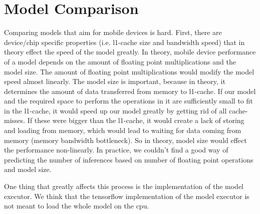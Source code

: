\iffalse
\section{Working with ImageNet}
Most of the research compares models based on ImageNet\cite{howard2017mobilenets} 
\fi
\section{Model Comparison}
Comparing models that aim for mobile devices is hard. First, there are device/chip specific properties (i.e. l1-cache size and bandwidth speed) that in theory effect the speed of the model greatly. In theory, mobile device performance of a model depends on the amount of floating point multiplications and the model size. The amount of floating point multiplications would modify the model speed almost linearly. The model size is important, because in theory, it determines the amount of data transferred from memory to l1-cache. If our model and the required space to perform the operations in it are sufficiently small to fit in the l1-cache, it would speed up our model greatly by getting rid of all cache-misses. If these were bigger than the l1-cache, it would create a lack of storing and loading from memory, which would lead to waiting for data coming from memory (memory bandwidth bottleneck). So in theory, model size would effect the performance non-linearly. In practice, we couldn't find a good way of predicting the number of inferences based on number of floating point operations and model size. 

One thing that greatly affects this process is the implementation of the model executor. We think that the tensorflow implementation of the model executor is not meant to load the whole model on the cpu. 

\iffalse
But as we understood, Tensorflow implementation is not executing models on model level, but on layer level (based on variable scopes). We think that is the case because when we look at a sufficiently small model's benchmarking results, we saw that the amount of context switches were equal to the number of variable scopes times the number of inferences.
\fi